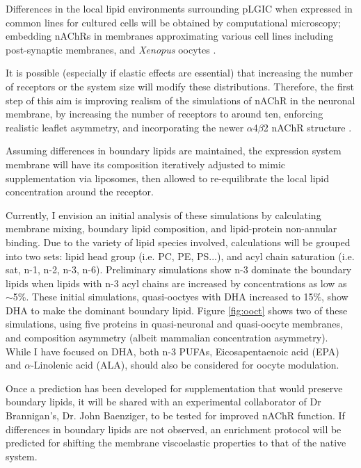\documentclass{article}
\begin{document}
Differences in the local lipid environments surrounding pLGIC when expressed in common lines for cultured cells will be obtained by computational microscopy; embedding nAChRs in membranes approximating various cell lines including post-synaptic membranes, and \textit{Xenopus} oocytes \cite{Lindi2001,Gamba2005}. 

It is possible (especially if elastic effects are essential) that increasing the number of receptors or the system size will modify these distributions. Therefore, the first step of this aim is improving realism of the simulations of nAChR in the neuronal membrane, by increasing the number of receptors to around ten, enforcing realistic leaflet asymmetry, and incorporating the newer $\alpha$4$\beta$2 nAChR structure \cite{Morales-Perez_X_2016}. 

Assuming differences in boundary lipids are maintained, the expression system membrane will have its composition iteratively adjusted to mimic supplementation via liposomes, then allowed to re-equilibrate the local lipid concentration around the receptor.

Currently, I envision an initial analysis of these simulations by calculating membrane mixing, boundary lipid composition, and lipid-protein non-annular binding. Due to the variety of lipid species involved, calculations will be grouped into two sets: lipid head group (i.e. PC, PE, PS...), and acyl chain saturation (i.e. sat, n-1, n-2, n-3, n-6). Preliminary simulations show n-3 dominate the boundary lipids when lipids with n-3 acyl chains are increased by concentrations as low as $\sim$5\%. These initial simulations, quasi-ooctyes with DHA increased to 15$\%$, show DHA to make the dominant boundary lipid. Figure \ref{fig:ooct} shows two of these simulations, using five proteins in quasi-neuronal and quasi-oocyte membranes, and composition asymmetry (albeit mammalian concentration asymmetry). While I have focused on DHA, both n-3 PUFAs, Eicosapentaenoic acid (EPA) and $\alpha$-Linolenic acid (ALA), should also be considered for oocyte modulation.

Once a prediction has been developed for supplementation that would preserve boundary lipids, it will be shared with an experimental collaborator of Dr Brannigan’s, Dr. John Baenziger, to be tested for improved nAChR function. If differences in boundary lipids are not observed, an enrichment protocol will be predicted for shifting the membrane viscoelastic properties to that of the native system.
\end{document}
